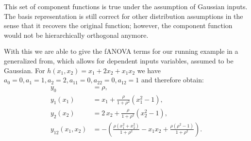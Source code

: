This set of component functions is true under the assumption of Gaussian inputs. The basis representation is still correct for other distribution assumptions in the sense that it recovers the original function; however, the component function would not be hierarchically orthogonal anymore.\par
With this we are able to give the fANOVA terms for our running example in a generalized from, which allows for dependent inputs variables, assumed to be Gaussian. For $h(x_1,x_2) = x_1 + 2x_2 + x_1 x_2$  we have $a_0 = 0, a_1 = 1, a_2 = 2, a_{11} = 0, a_{22} = 0, a_{12} = 1$ and therefore obtain:
\begin{align*}
y_0 &= \rho, \\[3pt]
y_1(x_1) &= x_1 + \frac{\rho}{1+\rho^2}(x_1^2 - 1), \\[3pt]
y_2(x_2) &= 2\,x_2 + \frac{\rho}{1+\rho^2}(x_2^2 - 1), \\[3pt]
y_{12}(x_1,x_2) 
&= -\left(\frac{\rho(x_1^2+x_2^2)}{1+\rho^2} - x_1 x_2 + \frac{\rho(\rho^2-1)}{1+\rho^2}\right).
\end{align*}




